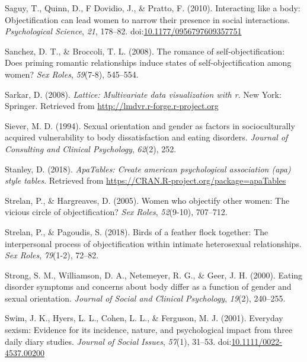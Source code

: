 \documentclass[
  man]{apa6}
\begin{document}
\leavevmode\hypertarget{ref-saguyetal2010}{}%
Saguy, T., Quinn, D., F Dovidio, J., \& Pratto, F. (2010). Interacting like a body: Objectification can lead women to narrow their presence in social interactions. \emph{Psychological Science}, \emph{21}, 178--82. doi:\href{https://doi.org/10.1177/0956797609357751}{10.1177/0956797609357751}

\leavevmode\hypertarget{ref-sanchez2008romance}{}%
Sanchez, D. T., \& Broccoli, T. L. (2008). The romance of self-objectification: Does priming romantic relationships induce states of self-objectification among women? \emph{Sex Roles}, \emph{59}(7-8), 545--554.

\leavevmode\hypertarget{ref-R-lattice}{}%
Sarkar, D. (2008). \emph{Lattice: Multivariate data visualization with r}. New York: Springer. Retrieved from \url{http://lmdvr.r-forge.r-project.org}

\leavevmode\hypertarget{ref-siever1994sexual}{}%
Siever, M. D. (1994). Sexual orientation and gender as factors in socioculturally acquired vulnerability to body dissatisfaction and eating disorders. \emph{Journal of Consulting and Clinical Psychology}, \emph{62}(2), 252.

\leavevmode\hypertarget{ref-R-apaTables}{}%
Stanley, D. (2018). \emph{ApaTables: Create american psychological association (apa) style tables}. Retrieved from \url{https://CRAN.R-project.org/package=apaTables}

\leavevmode\hypertarget{ref-strelan2005women}{}%
Strelan, P., \& Hargreaves, D. (2005). Women who objectify other women: The vicious circle of objectification? \emph{Sex Roles}, \emph{52}(9-10), 707--712.

\leavevmode\hypertarget{ref-strelan2018birds}{}%
Strelan, P., \& Pagoudis, S. (2018). Birds of a feather flock together: The interpersonal process of objectification within intimate heterosexual relationships. \emph{Sex Roles}, \emph{79}(1-2), 72--82.

\leavevmode\hypertarget{ref-strong2000eating}{}%
Strong, S. M., Williamson, D. A., Netemeyer, R. G., \& Geer, J. H. (2000). Eating disorder symptoms and concerns about body differ as a function of gender and sexual orientation. \emph{Journal of Social and Clinical Psychology}, \emph{19}(2), 240--255.

\leavevmode\hypertarget{ref-swimetal}{}%
Swim, J. K., Hyers, L. L., Cohen, L. L., \& Ferguson, M. J. (2001). Everyday sexism: Evidence for its incidence, nature, and psychological impact from three daily diary studies. \emph{Journal of Social Issues}, \emph{57}(1), 31--53. doi:\href{https://doi.org/10.1111/0022-4537.00200}{10.1111/0022-4537.00200}
\end{document}

